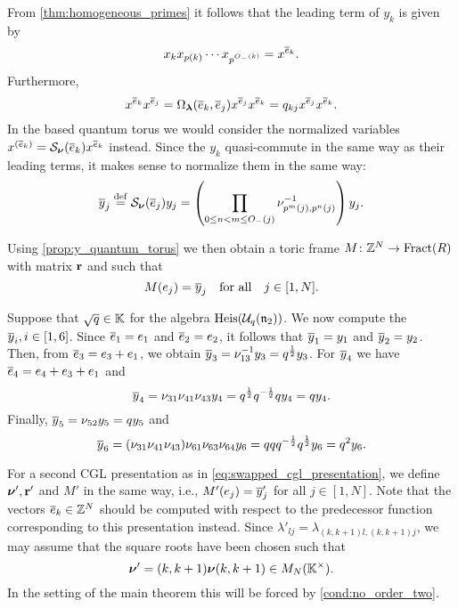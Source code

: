 From \cref{thm:homogeneous_primes} it follows that the leading term of $y_k$ is given
by
\begin{equation*}
	x_k x_{p(k)} \cdots x_{p^{O_{-}(k)}} = x^{\overline{e}_k}.
\end{equation*}
%
Furthermore,
\begin{equation*}
	x^{\overline{e}_k}x^{\overline{e}_j} = \Omega_{\boldsymbol{\lambda}}(\overline{e}_k, \overline{e}_j)x^{\overline{e}_j}x^{\overline{e}_k} = q_{kj}x^{\overline{e}_j}x^{\overline{e}_k}.
\end{equation*}
%
In the based quantum torus we would consider the normalized variables $x^{(\overline{e}_k)} =
	\mathcal{S}_{\boldsymbol{\nu}}(\overline{e}_k)x^{\overline{e}_k}$ instead. Since the $y_k$ quasi-commute in the same way as
their leading terms, it makes sense to normalize them in the same way:
\begin{equation}\label{eq:normalization_y}
	\overline{y}_j \overset{\mathrm{def}}{=} \mathcal{S}_{\boldsymbol{\nu}}(\overline{e}_j) y_j = \left(\prod_{0 \leq n < m \leq O_{-}(j)}\nu^{-1}_{p^m(j),p^n(j)}\right) y_j.
\end{equation}

Using \cref{prop:y_quantum_torus} we then obtain a toric frame $M \colon \mathbb{Z}^N \to
	\operatorname{Fract}(R)$ with matrix $\mathbf{r}$ and such that
\begin{equation*}
	M(e_j) = \overline{y}_j\quad \text{for all}\quad j \in [1, N].
\end{equation*}

\begin{example}\label{exmp:heisenberg_y_normalization}

	Suppose that $\sqrt{q} \in \mathbb{K}$ for the algebra $\operatorname{Heis}(\mathcal{U}_q(\mathfrak{n}_2))$. We
	now compute the $\overline{y}_i, i\in [1,6]$. Since $\overline{e}_1 = e_1$ and $\overline{e}_2 = e_2$, it follows
	that $\overline{y}_1 = y_1$ and $\overline{y}_2 = y_2$. Then, from $\overline{e}_3 = e_3 + e_1$, we obtain $\overline{y}_3
		= \nu_{13}^{-1} y_3 = q^{\frac{1}{2}}y_3$. For $\overline{y}_4$ we have $\overline{e}_4 = e_4 + e_3 + e_1$
	and
	\begin{equation*}
		\overline{y}_4 = \nu_{31}\nu_{41}\nu_{43}y_4 = q^{\frac{1}{2}}q^{-\frac{1}{2}}q y_4 = qy_4.
	\end{equation*}
	Finally, $\overline{y}_5 = \nu_{52}y_5 = q y_5$ and
	\begin{equation*}
		\overline{y}_6 = (\nu_{31}\nu_{41}\nu_{43})\nu_{61}\nu_{63}\nu_{64} y_6 = q qq^{-\frac{1}{2}}q^{\frac{1}{2}}y_6 = q^2 y_6.
	\end{equation*}
\end{example}

For a second CGL presentation as in \cref{eq:swapped_cgl_presentation}, we define
$\boldsymbol{\nu}', \mathbf{r}'$ and $M'$ in the same way, i.e., $M'(e_j) = \overline{y}'_j$ for all $j \in [1,
		N]$. Note that the vectors $\overline{e}_k \in \mathbb{Z}^N$ should be computed with respect to the
predecessor function corresponding to this presentation instead. Since $\lambda'_{lj} =
	\lambda_{(k, k+1)l, (k, k+1)j}$, we may assume that the square roots have been chosen
such that
\begin{equation*}
	\boldsymbol{\nu}' = (k, k+1)\boldsymbol{\nu} (k, k+1) \in M_N(\mathbb{K}^\times).
\end{equation*}
%
In the setting of the main theorem this will be forced by \cref{cond:no_order_two}.

